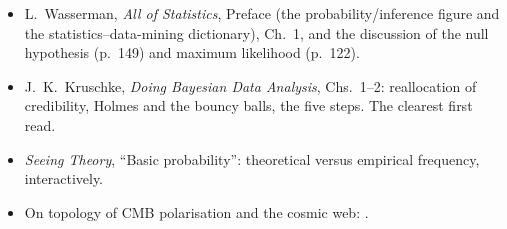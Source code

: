 \begin{sourcesays}
\begin{itemize}[leftmargin=1.5em]
  \item L.~Wasserman, \emph{All of Statistics}, Preface (the probability/inference figure and the statistics--data-mining dictionary), Ch.~1, and the discussion of the null hypothesis (p.~149) and maximum likelihood (p.~122).
  \item J.~K.~Kruschke, \emph{Doing Bayesian Data Analysis}, Chs.~1--2: reallocation of credibility, Holmes and the bouncy balls, the five steps. The clearest first read.
  \item \emph{Seeing Theory}, ``Basic probability'': theoretical versus empirical frequency, interactively.
  \item On topology of CMB polarisation and the cosmic web: \cite{VachaspatiLue2003,HutererVachaspati2005,ChallinorChon2002,Pranav2017,Wilding2021}.
\end{itemize}
\end{sourcesays}
  